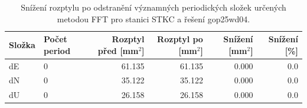 \begin{table}[htbp]
\caption{Snížení rozptylu po odstranění významných periodických složek určených metodou FFT pro stanici STKC a řešení gop25wd04.}
\label{tab:gop25wd04_stcd_stkc_detr_weighted_1seg_spectral_fft_variance_reduction}
\begin{tabular}{llrrrr}
\toprule
Složka & Počet period & Rozptyl před [mm$^2$] & Rozptyl po [mm$^2$] & Snížení [mm$^2$] & Snížení [\%] \\
\midrule
dE & 0 & 61.135 & 61.135 & 0.000 & 0.0 \\
dN & 0 & 35.122 & 35.122 & 0.000 & 0.0 \\
dU & 0 & 26.158 & 26.158 & 0.000 & 0.0 \\
\bottomrule
\end{tabular}
\end{table}
